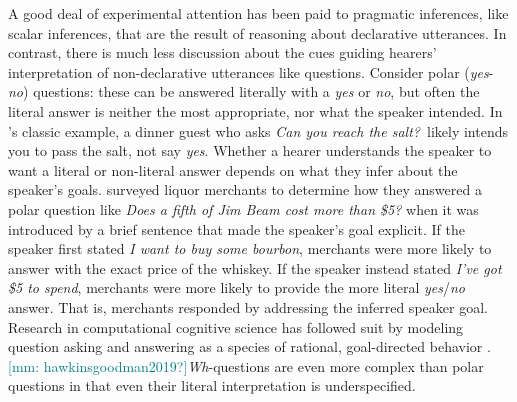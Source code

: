 \documentclass[12pt,letterpaper,table,svgnames,dvipsnames]{article}
\newcommand{\mm}[1]{\textcolor{teal}{[mm: #1]}}
\begin{document}
A good deal of experimental attention has been paid to pragmatic inferences, like scalar inferences, that are the result of reasoning about declarative utterances. In contrast, there is much less discussion about the cues guiding hearers' interpretation of non-declarative utterances like questions. Consider polar (\emph{yes}-\emph{no}) questions: these can be answered literally with a \emph{yes} or \emph{no}, but often the literal answer is neither the most appropriate, nor what the speaker intended. In 's classic example, a dinner guest who asks \emph{Can you reach the salt?}~likely intends you to pass the salt, not say \emph{yes}. Whether a hearer understands the speaker to want a literal or non-literal answer depends on what they infer about the speaker's goals.  surveyed liquor merchants to determine how they answered a polar question like \emph{Does a fifth of Jim Beam cost more than \$5?} when it was introduced by a brief sentence that made the speaker's goal explicit. If the speaker first stated \emph{I want to buy some bourbon}, merchants were more likely to answer with the exact price of the whiskey. If the speaker instead stated \emph{I've got \$5 to spend}, merchants were more likely to provide the more literal \emph{yes}/\emph{no} answer. That is, merchants responded by addressing the inferred speaker goal. Research in computational cognitive science has followed suit by modeling question asking and answering as a species of rational, goal-directed behavior \cite{hawkinsetal2015,rotheetal2018}. \mm{hawkinsgoodman2019?}\emph{Wh}-questions are even more complex than polar questions in that even their literal interpretation is underspecified. 






\setlength{\bibleftmargin}{.125in}
\setlength{\bibindent}{-\bibleftmargin}


\end{document}
